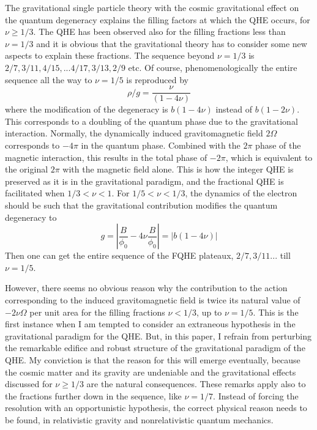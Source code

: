 \documentclass[aps,preprint,12pt,tightenlines]{revtex4}%
\begin{document}
The gravitational single particle theory with the cosmic gravitational effect
on the quantum degeneracy explains the filling factors at which the QHE
occurs, for $\nu\geq1/3$. The QHE has been observed also for the filling
fractions less than $\nu=1/3$ and it is obvious that the gravitational theory
has to consider some new aspects to explain these fractions. The sequence
beyond $\nu=1/3$ is $2/7,3/11,4/15,...4/17,3/13,2/9$ etc. Of course, phenomenologically
the entire sequence all the way to $\nu=1/5$ is reproduced by
\begin{equation}
\rho/g=\frac{\nu}{\left(  1-4\nu\right)  }%
\end{equation}
where the modification of the degeneracy is $b\left(1-4\nu\right)$ instead
of $b\left(1-2\nu\right)$. This corresponds to a doubling of the quantum
phase due to the gravitational interaction. Normally, the dynamically induced gravitomagnetic
field $2\Omega$ corresponds to $-4\pi$ in the quantum phase. Combined with the
$2\pi$ phase of the magnetic interaction, this results in the total phase of
$-2\pi$, which is equivalent to the original $2\pi$ with the magnetic field
alone. This is how the integer QHE is preserved as it is in the gravitational
paradigm, and the fractional QHE is facilitated when $1/3<\nu<1$. For
$1/5<\nu<1/3$, the dynamics of the electron should be such that the gravitational contribution modifies the quantum degeneracy
to
\begin{equation}
g=\left\vert \frac{B}{\phi_{0}}-4\nu\frac{B}{\phi_{0}}\right\vert =\left\vert
b\left(  1-4\nu\right)  \right\vert
\end{equation}
Then one can get the entire sequence of the FQHE plateaux, $2/7,3/11...$ till
$\nu=1/5$.

However, there seems no obvious reason why the contribution to the action
corresponding to the induced gravitomagnetic field is twice its natural value
of $-2\nu\Omega$ per unit area for the filling fractions $\nu<1/3$, up to
$\nu=1/5$. This is the first instance when I am tempted to consider an
extraneous hypothesis in the gravitational paradigm for the QHE. But, in this paper, I
refrain from perturbing the remarkable edifice and robust structure of the
gravitational paradigm of the QHE. My conviction is that the reason for this
will emerge eventually, because the cosmic matter and its gravity are
undeniable and the gravitational effects discussed for $\nu\geq1/3$ are the
natural consequences. These remarks apply also to the fractions further down
in the sequence, like $\nu=1/7$. Instead of forcing the resolution
with an opportunistic hypothesis, the correct physical reason needs to be
found, in relativistic gravity and nonrelativistic quantum mechanics.
\end{document}
